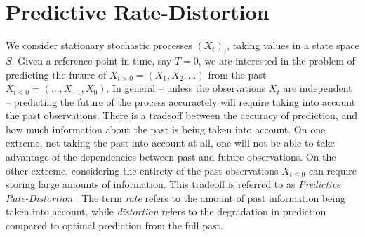 \documentclass[11pt,letterpaper]{article}
\begin{document}




\section{Predictive Rate-Distortion}\label{sec:background}


We consider stationary stochastic processes $(X_t)_t$, taking values in a state space $S$.
Given a reference point in time, say $T=0$, we are interested in the problem of predicting the future of $X_{t>0} = (X_1, X_2, ...)$ from the past $X_{t\leq 0} = (..., X_{-1}, X_0)$.
In general -- unless the observations $X_t$ are independent -- predicting the future of the process accuractely will require taking into account the past observations.
There is a tradeoff between the accuracy of prediction, and how much information about the past is being taken into account.
On one extreme, not taking the past into account at all, one will not be able to take advantage of the dependencies between past and future observations.
On the other extreme, considering the entirety of the past observations $X_{t \leq 0}$ can require storing large amounts of information.
This tradeoff is referred to as \emph{Predictive Rate-Distortion} \citep{marzen-predictive-2016}.
The term \emph{rate} refers to the amount of past information being taken into account, while \emph{distortion} refers to the degradation in prediction compared to optimal prediction from the full past.
\end{document}

